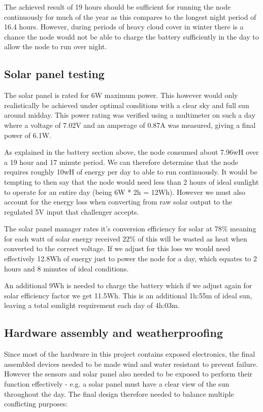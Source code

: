 The achieved result of 19 hours should be sufficient for running the node
continuously for much of the year as this compares to the longest night period
of 16.4 hours. However, during periods of heavy cloud cover in winter there is a
chance the node would not be able to charge the battery sufficiently in the day
to allow the node to run over night.

\subsection{Solar panel testing}

The solar panel is rated for 6W maximum power. This however would only
realistically be achieved under optimal conditions with a clear sky and full sun
around midday. This power rating was verified using a multimeter on such a day
where a voltage of 7.02V and an amperage of 0.87A was measured, giving a final
power of 6.1W.

As explained in the battery section above, the node consumed about 7.96wH over a
19 hour and 17 minute period. We can therefore determine that the node requires
roughly 10wH of energy per day to able to run continuously. It would be tempting
to then say that the node would need less than 2 hours of ideal sunlight to
operate for an entire day (being 6W * 2h = 12Wh). However we must also account
for the energy loss when converting from raw solar output to the regulated 5V
input that challenger accepts.

The solar panel manager rates it's conversion efficiency for solar at 78\%
meaning for each watt of solar energy received 22\% of this will be wasted as
heat when converted to the correct voltage. If we adjust for this loss we would
need effectively 12.8Wh of energy just to power the node for a day, which
equates to 2 hours and 8 minutes of ideal conditions.

An additional 9Wh is needed to charge the battery which if we adjust again for
solar efficiency factor we get 11.5Wh. This is an additional 1h:55m of ideal
sun, leaving a total sunlight requirement each day of 4h:03m.

\subsection{Hardware assembly and weatherproofing}

Since most of the hardware in this project contains exposed electronics, the
final assembled devices needed to be made wind and water resistant to prevent
failure. However the sensors and solar panel also needed to be exposed to
perform their function effectively - e.g. a solar panel must have a clear view
of the sun throughout the day. The final design therefore needed to balance
multiple conflicting purposes:

